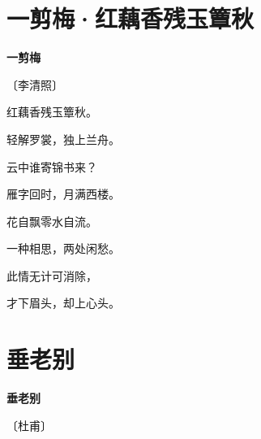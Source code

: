 \documentclass[12pt,UTF-8,openany,fontset=none]{ctexbook}
\begin{document}
\vspace{8pt}
\clearpage

\section{一剪梅·红藕香残玉簟秋}


\begin{center}
    {\bfseries 一剪梅}

    \vspace{18pt}

    \begin{large}\xuwen
        〔李清照〕
    \end{large}

\end{center}

    \vspace{18pt}  %

\begin{center}
    \begin{Large}

        红藕香残玉簟秋。

        轻解罗裳，独上兰舟。

        云中谁寄锦书来？

        雁字回时，月满西楼。

        \vspace{18pt}  %

        花自飘零水自流。

        一种相思，两处闲愁。

        此情无计可消除，

        才下眉头，却上心头。

    \end{Large}

\end{center}

\vspace{8pt}
\clearpage

\section{垂老别}


\begin{center}
    {\bfseries 垂老别}

    \vspace{18pt}

    \begin{large}\xuwen
        〔杜甫〕
    \end{large}

\end{center}
\end{document}
